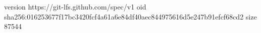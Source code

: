 version https://git-lfs.github.com/spec/v1
oid sha256:016253677f17bc3420fcf4a61a6e84df40aec844975616d5e247b91efcf68cd2
size 87544
